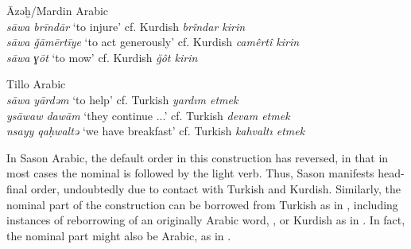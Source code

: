 \documentclass[output=paper]{langsci/langscibook}
\begin{document}
\begin{exe}
\ex \label{light}  
		\begin{xlist}
		\ex Āzəḫ/Mardin Arabic \citep[184]{Talay2007}\\ \textit{s\={a}wa brīndār} `to injure'	cf. Kurdish \textit{brîndar kirin}\\
\textit{s\={a}wa \v{g}āmērtīye} `to act generously' cf. Kurdish \textit{camêrtî kirin}\\
\textit{s\={a}wa ɣōt} `to mow' cf. Kurdish  \textit{ğôt kirin}


	\ex \label{com2} Tillo Arabic \citep[202]{Lahdo2009}\\ \textit{s\={a}wa yārdəm} `to help' cf. Turkish \textit{yardım etmek}\\
\textit{ys\={a}waw dawām} `they continue ...' cf.  Turkish \textit{devam etmek}\\
\textit{nsayy qa\d{h}waltə} `we have breakfast' cf. Turkish \textit{kahvalt{\i} etmek}
		\end{xlist}
		
\end{exe}


\noindent In Sason Arabic, the default order in this construction has reversed, in that in most cases the nominal is followed by the light verb. Thus, Sason manifests head-final order, undoubtedly due to contact with Turkish and Kurdish. Similarly, the nominal part of the construction can be borrowed from Turkish as in , including instances of reborrowing of an originally Arabic word, , or Kurdish as in . In fact, the nominal part might also be Arabic, as in . 
\end{document}

